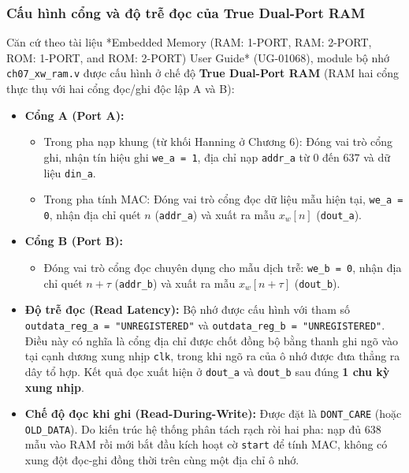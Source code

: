 \subsubsection*{Cấu hình cổng và độ trễ đọc của True Dual-Port RAM}
Căn cứ theo tài liệu *Embedded Memory (RAM: 1-PORT, RAM: 2-PORT, ROM: 1-PORT, and ROM: 2-PORT) User Guide* (UG-01068), module bộ nhớ \texttt{ch07\_xw\_ram.v} được cấu hình ở chế độ \textbf{True Dual-Port RAM} (RAM hai cổng thực thụ với hai cổng đọc/ghi độc lập A và B):
\begin{itemize}[leftmargin=1.5em, itemsep=2pt]
    \item \textbf{Cổng A (Port A):}
    \begin{itemize}[leftmargin=1.2em, itemsep=1pt]
        \item Trong pha nạp khung (từ khối Hanning ở Chương 6): Đóng vai trò cổng ghi, nhận tín hiệu ghi \texttt{we\_a = 1}, địa chỉ nạp \texttt{addr\_a} từ $0$ đến $637$ và dữ liệu \texttt{din\_a}.
        \item Trong pha tính MAC: Đóng vai trò cổng đọc dữ liệu mẫu hiện tại, \texttt{we\_a = 0}, nhận địa chỉ quét $n$ (\texttt{addr\_a}) và xuất ra mẫu $x_w[n]$ (\texttt{dout\_a}).
    \end{itemize}
    \item \textbf{Cổng B (Port B):}
    \begin{itemize}[leftmargin=1.2em, itemsep=1pt]
        \item Đóng vai trò cổng đọc chuyên dụng cho mẫu dịch trễ: \texttt{we\_b = 0}, nhận địa chỉ quét $n+\tau$ (\texttt{addr\_b}) và xuất ra mẫu $x_w[n+\tau]$ (\texttt{dout\_b}).
    \end{itemize}
    \item \textbf{Độ trễ đọc (Read Latency):}
    Bộ nhớ được cấu hình với tham số \texttt{outdata\_reg\_a = "UNREGISTERED"} và \texttt{outdata\_reg\_b = "UNREGISTERED"}. Điều này có nghĩa là cổng địa chỉ được chốt đồng bộ bằng thanh ghi ngõ vào tại cạnh dương xung nhịp \texttt{clk}, trong khi ngõ ra của ô nhớ được đưa thẳng ra dây tổ hợp. Kết quả đọc xuất hiện ở \texttt{dout\_a} và \texttt{dout\_b} sau đúng \textbf{1 chu kỳ xung nhịp}.
    \item \textbf{Chế độ đọc khi ghi (Read-During-Write):}
    Được đặt là \texttt{DONT\_CARE} (hoặc \texttt{OLD\_DATA}). Do kiến trúc hệ thống phân tách rạch ròi hai pha: nạp đủ 638 mẫu vào RAM rồi mới bắt đầu kích hoạt cờ \texttt{start} để tính MAC, không có xung đột đọc-ghi đồng thời trên cùng một địa chỉ ô nhớ.
\end{itemize}

